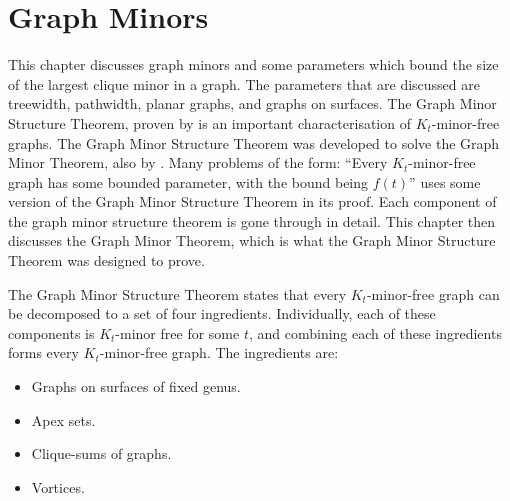 \chapter{Graph Minors}\label{chap:gmst}
This chapter discusses graph minors and some parameters which bound the size of the largest clique minor in a graph. The parameters that are discussed are treewidth, pathwidth, planar graphs, and graphs on surfaces. 
The Graph Minor Structure Theorem, proven by \textcite{robertsonGraphMinorsXVI2003} is an important characterisation of $K_t$-minor-free graphs. The Graph Minor Structure Theorem was developed to solve the Graph Minor Theorem, also by \textcite{robertsonGraphMinorsXX2004}. Many problems of the form: ``Every $K_t$-minor-free graph has some bounded parameter, with the bound being $f(t)$'' uses some version of the Graph Minor Structure Theorem in its proof. 
Each component of the graph minor structure theorem is gone through in detail. This chapter then discusses the Graph Minor Theorem, which is what the Graph Minor Structure Theorem was designed to prove.

The Graph Minor Structure Theorem states that every $K_t$-minor-free graph can be decomposed to a set of four ingredients. Individually, each of these components is $K_t$-minor free for some $t$, and combining each of these ingredients forms every $K_t$-minor-free graph. The ingredients are:
\begin{itemize}
	\item Graphs on surfaces of fixed genus.
	\item Apex sets.
	\item Clique-sums of graphs.
	\item Vortices.
\end{itemize}














\newpage
